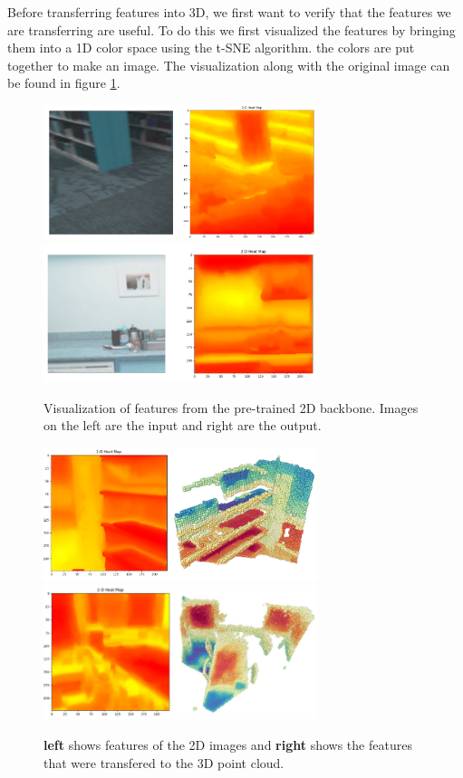 \documentclass[10pt,twocolumn,letterpaper]{article}
\newcommand{\AJ}[1]{{\color{red}{[Andrej: #1]}}}
\begin{document}
Before transferring features into 3D, we first want to verify that the features we are transferring are useful. To do this we first visualized the features by bringing them into a 1D color space using the t-SNE \cite{maaten2008Visualizing} algorithm. the colors are put together to make an image. The visualization along with the original image can be found in figure \ref{fig:features2dvis}.

\AJ{Need to train a 2D segmentation with and without pre-training.}

\begin{figure}
    \centering
    \includegraphics[width=8cm]{images/experiments/25.02.2022-image-pretrain-vis2.png}
    \includegraphics[width=8cm]{images/experiments/25.02.2022-image-pretrain-vis1.png}
    \caption{Visualization of features from the pre-trained 2D backbone. Images on the left are the input and right are the output.}
    \label{fig:features2dvis}
\end{figure}

\begin{figure}
    \centering
    \includegraphics[width=8cm]{images/experiments/image-to-point-vis1.png}
    \includegraphics[width=8cm]{images/experiments/image-to-point-vis2.png}
    \caption{\textbf{left} shows features of the 2D images and \textbf{right} shows the features that were transfered to the 3D point cloud.}
    \label{fig:features2d-3dvis}
\end{figure}
\end{document}
